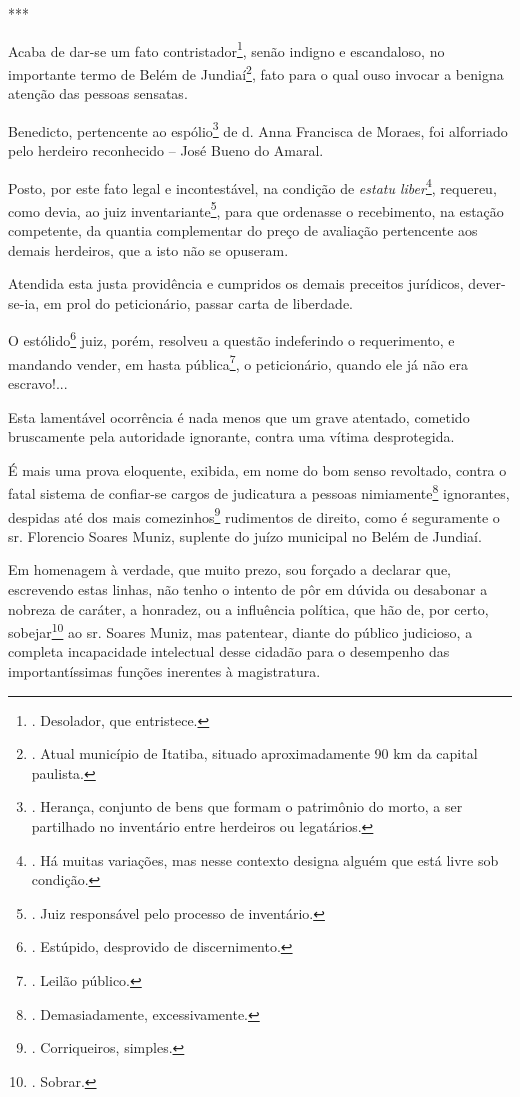 ***

Acaba de dar-se um fato contristador\footnote{. Desolador, que
  entristece.}, senão indigno e escandaloso, no importante termo de
Belém de Jundiaí\footnote{. Atual município de Itatiba, situado
  aproximadamente 90 km da capital paulista.}, fato para o qual ouso
invocar a benigna atenção das pessoas sensatas.

Benedicto, pertencente ao espólio\footnote{. Herança, conjunto de bens
  que formam o patrimônio do morto, a ser partilhado no inventário entre
  herdeiros ou legatários.} de d. Anna Francisca de Moraes, foi
alforriado pelo herdeiro reconhecido -- José Bueno do Amaral.

Posto, por este fato legal e incontestável, na condição de \emph{estatu
liber}\footnote{. Há muitas variações, mas nesse contexto designa alguém
  que está livre sob condição.}, requereu, como devia, ao juiz
inventariante\footnote{. Juiz responsável pelo processo de inventário.},
para que ordenasse o recebimento, na estação competente, da quantia
complementar do preço de avaliação pertencente aos demais herdeiros, que
a isto não se opuseram.

Atendida esta justa providência e cumpridos os demais preceitos
jurídicos, dever-se-ia, em prol do peticionário, passar carta de
liberdade.

O estólido\footnote{. Estúpido, desprovido de discernimento.} juiz,
porém, resolveu a questão indeferindo o requerimento, e mandando vender,
em hasta pública\footnote{. Leilão público.}, o peticionário, quando ele
já não era escravo!...

Esta lamentável ocorrência é nada menos que um grave atentado, cometido
bruscamente pela autoridade ignorante, contra uma vítima desprotegida.

É mais uma prova eloquente, exibida, em nome do bom senso revoltado,
contra o fatal sistema de confiar-se cargos de judicatura a pessoas
nimiamente\footnote{. Demasiadamente, excessivamente.} ignorantes,
despidas até dos mais comezinhos\footnote{. Corriqueiros, simples.}
rudimentos de direito, como é seguramente o sr. Florencio Soares Muniz,
suplente do juízo municipal no Belém de Jundiaí.

Em homenagem à verdade, que muito prezo, sou forçado a declarar que,
escrevendo estas linhas, não tenho o intento de pôr em dúvida ou
desabonar a nobreza de caráter, a honradez, ou a influência política,
que hão de, por certo, sobejar\footnote{. Sobrar.} ao sr. Soares Muniz,
mas patentear, diante do público judicioso, a completa incapacidade
intelectual desse cidadão para o desempenho das importantíssimas funções
inerentes à magistratura.

